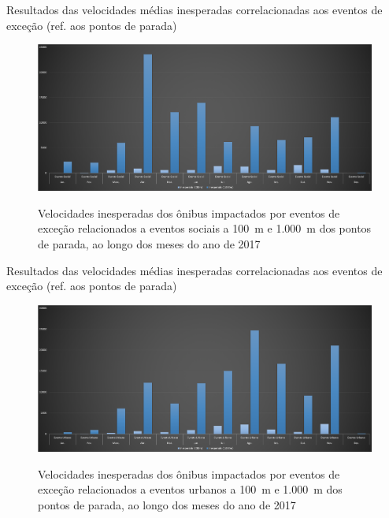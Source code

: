 \documentclass{beamer}
\begin{document}
\begin{frame}{Resultados das velocidades médias inesperadas correlacionadas aos eventos de exceção (ref. aos pontos de parada)}
\begin{figure}[!htb]
	\centering
 	  \caption{Velocidades inesperadas dos ônibus impactados por eventos de exceção relacionados a eventos sociais a 100~m e 1.000~m dos pontos de parada, ao longo dos meses do ano de 2017}
		\includegraphics[width=0.8\linewidth]{apriori_analysis_stops_social_events.png}
	\label{fig:apriori_analysis_stops_social_events}
\end{figure}
\end{frame}
\begin{frame}{Resultados das velocidades médias inesperadas correlacionadas aos eventos de exceção (ref. aos pontos de parada)}
\begin{figure}[!htb]
	\centering
 	  \caption{Velocidades inesperadas dos ônibus impactados por eventos de exceção relacionados a eventos urbanos a 100~m e 1.000~m dos pontos de parada, ao longo dos meses do ano de 2017}
		\includegraphics[width=0.8\linewidth]{apriori_analysis_stops_urban_events.png}
	\label{fig:apriori_analysis_stops_urban_events}
\end{figure}
\end{frame}
\end{document}
